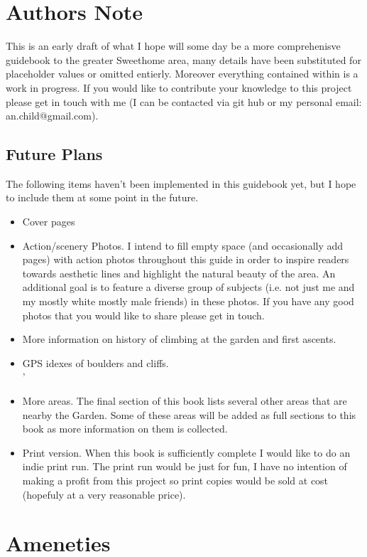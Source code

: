 \section{Authors Note}
This is an early draft of what I hope will some day be a more comprehenisve guidebook to the greater Sweethome area, many details have been substituted for placeholder values or omitted entierly. Moreover everything contained within is a work in progress. If you would like to contribute your knowledge to this project please get in touch with me (I can be contacted via git hub or my personal email: an.child@gmail.com).
\subsection*{Future Plans}
The following items haven't been implemented in this guidebook yet, but I hope to include them at some point in the future.
\begin{itemize}
\item Cover pages\\
\item Action/scenery Photos. I intend to fill empty space (and occasionally add pages) with action photos throughout this guide in order to inspire readers towards aesthetic lines and highlight the natural beauty of the area. An additional goal is to feature a diverse group of subjects (i.e. not just me and my mostly white mostly male friends) in these photos. If you have any good photos that you would like to share please get in touch.\\
\item More information on history of climbing at the garden and first ascents.\\
\item GPS idexes of boulders and cliffs.\\'
\item More areas. The final section of this book lists several other areas that are nearby the Garden. Some of these areas will be added as full sections to this book as more information on them is collected.
\item Print version. When this book is sufficiently complete I would like to do an indie print run. The print run would be just for fun, I have no intention of making a profit from this project so print copies would be sold at cost (hopefuly at a very reasonable price).
\end{itemize}
\section{Ameneties}
